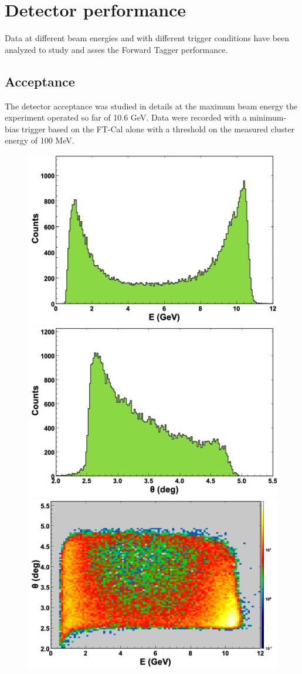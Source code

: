 \section{Detector performance}
Data at different beam energies and with different trigger conditions have been analyzed to study and asses the Forward Tagger performance. 

\subsection{Acceptance}
The detector acceptance was studied in details at the maximum beam energy the experiment operated so far of 10.6 GeV. Data were recorded with a minimum-bias trigger based on the FT-Cal alone with a threshold on the measured cluster energy of 100 MeV. 
\begin{figure}[ht]
\begin{center}
\includegraphics[height=0.56\columnwidth]{fig/ft_acceptance_energy.png}
\includegraphics[height=0.56\columnwidth]{fig/ft_acceptance_theta.png}
\includegraphics[height=0.56\columnwidth]{fig/ft_acceptance_energytheta.png}

\end{center}
\end{figure}

